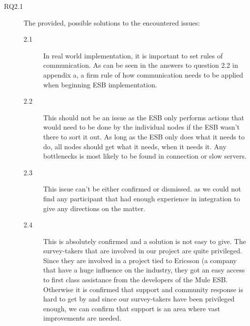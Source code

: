 \documentclass{llncs}
\begin{document}
\begin{description}
\item[RQ2.1] The provided, possible solutions to the encountered issues:
\begin{description}
\item[2.1] In real world implementation, it is important to set rules of communication. As can be seen in the answers to question 2.2 in appendix a, a firm rule of how communication needs to be applied when beginning ESB implementation. 
\item[2.2] This should not be an issue as the ESB only performs actions that would need to be done by the individual nodes if the ESB wasn’t there to sort it out. As long as the ESB only does what it needs to do, all nodes should get what it needs, when it needs it. Any bottlenecks is most likely to be found in connection or slow servers.
\item[2.3] This issue can’t be either confirmed or dismissed. as we could not find any participant that had enough experience in integration to give any directions on the matter.
\item[2.4] This is absolutely confirmed and a solution is not easy to give. The survey-takers that are involved in our project are quite privileged. Since they are involved in a project tied to Ericsson (a company that have a huge influence on the industry, they got an easy access to first class assistance from the developers of the Mule ESB. Otherwise it is confirmed that support and community response is hard to get by and since our survey-takers have been privileged enough, we can confirm that support is an area where vast improvements are needed. 
\end{description}


\end{description}
\end{document}
